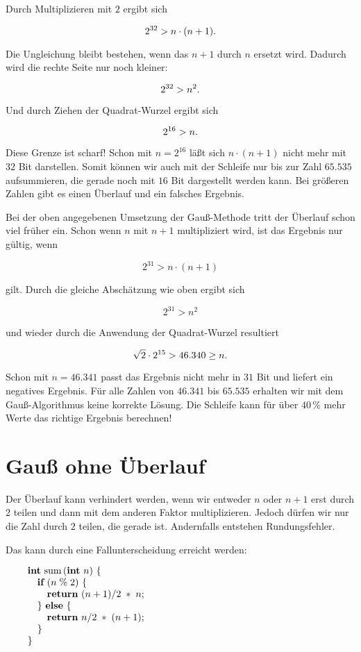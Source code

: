 Durch Multiplizieren mit $2$ ergibt sich

$$2^{32} > n\cdot(n+1)\hbox{.}$$

\noindent Die Ungleichung bleibt bestehen, wenn das $n+1$ durch $n$
ersetzt wird. Dadurch wird die rechte Seite nur noch kleiner:

$$2^{32} > n^2\hbox{.}$$

\noindent Und durch Ziehen der Quadrat-Wurzel ergibt sich

$$2^{16} > n\hbox{.}$$

\noindent Diese Grenze ist scharf! Schon mit $n=2^{16}$ läßt sich
$n\cdot(n+1)$ nicht mehr mit $32$ Bit darstellen.
Somit können wir auch mit der Schleife nur bis zur Zahl $65.535$
aufsummieren, die gerade noch mit $16$ Bit dargestellt werden kann.
Bei größeren Zahlen gibt es einen Überlauf und ein falsches Ergebnis.

Bei der oben angegebenen Umsetzung der Gauß-Methode tritt der
Überlauf schon viel früher ein.
Schon wenn $n$ mit $n+1$ multipliziert wird, ist das Ergebnis nur gültig,
wenn

$$2^{31}>n\cdot(n+1)$$

\noindent gilt.
Durch die gleiche Abschätzung wie oben ergibt sich

$$2^{31}>n^2$$

\noindent und wieder durch die Anwendung der Quadrat-Wurzel resultiert

$$\sqrt{2}\cdot2^{15}>46.340\geq n\hbox{.}$$

\noindent Schon mit $n=46.341$ passt das Ergebnis nicht mehr in $31$ Bit und liefert
ein negatives Ergebnis.
Für alle Zahlen von $46.341$ bis $65.535$ erhalten wir mit dem
Gauß-Algorithmus keine korrekte Lösung.
Die Schleife kann für über $40\,\%$ mehr Werte das richtige Ergebnis
berechnen!

\section{Gauß ohne Überlauf}%
%
Der Überlauf kann verhindert werden, wenn wir entweder $n$ oder
$n+1$ erst durch $2$ teilen und dann mit dem anderen Faktor
multiplizieren.
Jedoch dürfen wir nur die Zahl durch $2$ teilen, die gerade
ist.
Andernfalls entstehen Rundungsfehler.

Das kann durch eine Fallunterscheidung erreicht werden:

$$\vbox{\obeylines
{\bf int} sum$\,$({\bf int} $n$) $\{$
\quad {\bf if} ($n\mathrel\% 2$) $\{$
\qquad {\bf return} $(n + 1)/2\;*\;n$;
\quad $\}$ {\bf else} $\{$
\qquad {\bf return} $n/2 \;*\; (n + 1)$;
\quad $\}$
$\}$}$$

